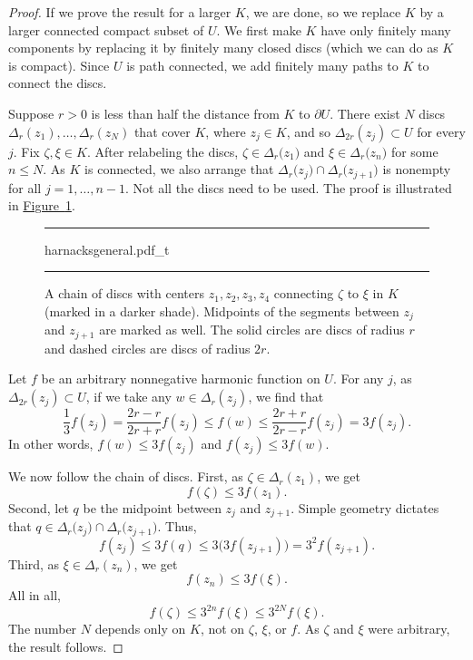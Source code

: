 \documentclass[12pt,openany]{book}
\theoremstyle{plain}
\theoremstyle{remark}
\theoremstyle{definition}
\newenvironment{myfig}{%
\begin{figure}[h!t]
\noindent\rule{\textwidth}{0.5pt}\vspace{12pt}\par\centering}%
{\par\noindent\rule{\textwidth}{0.5pt}
\end{figure}}
\theoremstyle{exercise}
\theoremstyle{example}
\newcommand{\figureref}[1]{\hyperref[#1]{Figure~\ref*{#1}}}
\begin{document}
\begin{proof}
If we prove the result for a larger $K$, we are done, so we
replace $K$ by a larger connected compact subset of $U$.
We first make $K$ have only finitely many components by replacing it
by finitely many closed discs
(which we can do as $K$ is compact).  Since $U$ is path
connected, we add finitely many paths to $K$ to connect
the discs.

Suppose $r> 0$ is less than half the distance from $K$ to $\partial U$.
There exist $N$ discs $\Delta_{r}(z_1),\ldots,\Delta_{r}(z_N)$ that cover $K$,
where $z_j \in K$, and so $\Delta_{2r}(z_j) \subset U$ for every $j$.
Fix $\zeta,\xi \in K$.  After relabeling the discs,
$\zeta \in \Delta_{r}\bigl(z_{1}\bigr)$
and
$\xi \in \Delta_{r}\bigl(z_{n}\bigr)$ for some $n \leq N$.
As $K$ is connected, we also arrange that
$\Delta_{r}\bigl(z_{j}\bigr) \cap \Delta_{r}\bigl(z_{j+1}\bigr)$
is nonempty for all $j=1,\ldots,n-1$.
Not all the discs need to be used.
The proof is illustrated in \figureref{fig:harnacksgeneral}.

\begin{myfig}
{harnacksgeneral.pdf_t}
\caption{A chain of discs with centers $z_1,z_2,z_3,z_4$ connecting
$\zeta$ to $\xi$ in $K$ (marked in a darker shade).  Midpoints of the segments
between $z_j$ and $z_{j+1}$ are marked as well.
The solid circles are discs of radius $r$ and
dashed circles are discs of radius $2r$.\label{fig:harnacksgeneral}}
\end{myfig}

Let $f$ be an arbitrary nonnegative harmonic function on $U$.
For any $j$, as $\Delta_{2r}(z_j) \subset U$, if we take any $w \in
\Delta_r(z_j)$, we find that 
\begin{equation*}
\frac{1}{3} f(z_j) = 
\frac{2r-r}{2r+r} f(z_j)
\leq
f(w)
\leq \frac{2r+r}{2r-r} f(z_j)
= 3 f(z_j) .
\end{equation*}
In other words, $f(w) \leq 3 f(z_j)$ and $f(z_j) \leq 3 f(w)$.

We now follow the chain of discs.
First, as $\zeta \in \Delta_r(z_1)$, we get 
\begin{equation*}
f(\zeta) \leq 3 f(z_1).
\end{equation*}
Second, let
$q$ be the midpoint between $z_{j}$ and $z_{j+1}$.
Simple geometry dictates that
$q \in \Delta_{r}\bigl(z_{j}\bigr) \cap \Delta_{r}\bigl(z_{j+1}\bigr)$.
Thus,
\begin{equation*}
f(z_j) \leq 3 f(q) \leq 3 \bigl( 3 f(z_{j+1}) \bigr) = 3^2 f(z_{j+1}).
\end{equation*}
Third, as $\xi \in \Delta_r(z_n)$, we get 
\begin{equation*}
f(z_n) \leq 3 f(\xi).
\end{equation*}
All in all,
\begin{equation*}
f(\zeta) \leq
3^{2n}
f(\xi)
\leq
3^{2N}
f(\xi) .
\end{equation*}
The number $N$ depends only on $K$, not on $\zeta$, $\xi$, or $f$.
As $\zeta$ and $\xi$ were arbitrary, the result follows.
\end{proof}
\end{document}
